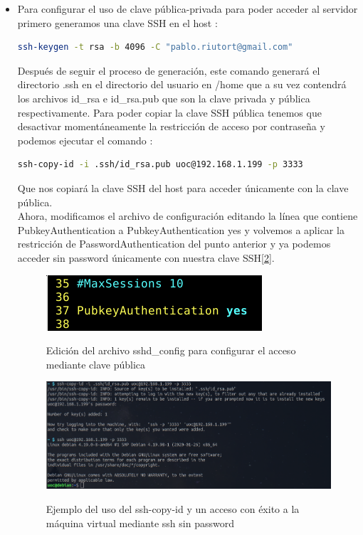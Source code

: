 \documentclass[10pt,a4paper]{article}
\begin{document}
\begin{enumerate}[label=\textbf{\alph*)}]
\begin{itemize}
\item Para configurar el uso de clave pública-privada para poder acceder al servidor primero generamos una clave SSH en el host \cite{keygen}:
\begin{lstlisting}[language=bash]
ssh-keygen -t rsa -b 4096 -C "pablo.riutort@gmail.com"
\end{lstlisting}
Después de seguir el proceso de generación, este comando generará el directorio .ssh en el directorio del usuario en /home que a su vez contendrá los archivos id\_rsa e id\_rsa.pub que son la clave privada y pública respectivamente.
Para poder copiar la clave SSH pública tenemos que desactivar momentáneamente la restricción de acceso por contraseña y podemos ejecutar el comando \cite{sshcopy}:
\begin{lstlisting}[language=bash]
ssh-copy-id -i .ssh/id_rsa.pub uoc@192.168.1.199 -p 3333
\end{lstlisting}
Que nos copiará la clave SSH del host para acceder únicamente con la clave pública.\\

Ahora, modificamos el archivo de configuración editando la línea que contiene PubkeyAuthentication a PubkeyAuthentication yes y volvemos a aplicar la restricción de PasswordAuthentication del punto anterior y ya podemos acceder sin password únicamente con nuestra clave SSH[\ref{fig:sshcopy}].
\begin{figure}[h!]
  \centering
  \includegraphics[scale=0.4]{ssh8.png}\\
  \caption{Edición del archivo sshd\_config para configurar el acceso mediante clave pública}
  \label{fig:pubkey}
\end{figure}
\begin{figure}[h!]
  \centering
  \includegraphics[scale=0.4]{ssh7.png}\\
  \caption{Ejemplo del uso del ssh-copy-id y un acceso con éxito a la máquina virtual mediante ssh sin password}
  \label{fig:sshcopy}
\end{figure}


\end{itemize}
\end{enumerate}
\end{document}
